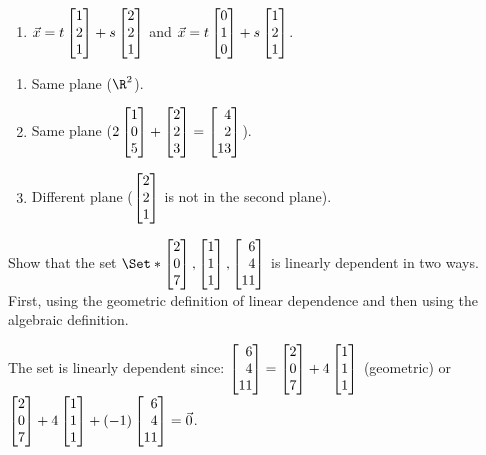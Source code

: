 \begin{exercises}
\begin{problist}
\begin{enumerate}
			\item $\vec x = t\mat{1\\2\\1}+ s\mat{2\\2\\1}$ and $\vec
			x = t\mat{0\\1\\0}+ s\mat{1\\2\\1}$.
		\end{enumerate}
		\begin{solution}
			\begin{enumerate}
				\item Same plane ($\R^2$).
				\item Same plane ($2\mat{1\\0\\5} + \mat{2\\2\\3} = \mat{4\\2\\13}$).
				\item Different plane ($\mat{2\\2\\1}$ is not in the second plane).
			\end{enumerate}
		\end{solution}
		
		\prob Show that the set $\Set*{\mat{2\\0\\7},\mat{1\\1\\1},\mat{6\\4\\11}}$
		is linearly dependent in two ways. First, using the geometric definition of linear dependence
		and then using the algebraic definition.
		\begin{solution}
			The set is linearly dependent since: $\mat{6\\4\\11}=
			\mat{2\\0\\7}+ 4\mat{1\\1\\1}$ (geometric) or
			$\mat{2\\0\\7}+ 4\mat{1\\1\\1}+ (-1)\mat{6\\4\\11}=\vec 0$.
		\end{solution}
		

\end{problist}
\end{exercises}
